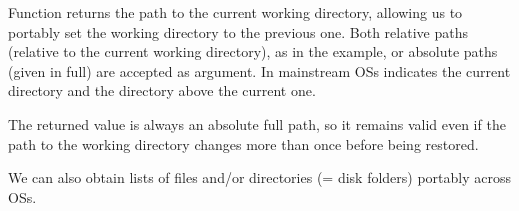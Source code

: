\documentclass[krantz2]{krantz}\usepackage{knitr}%
\begin{document}
\begin{knitrout}\footnotesize
{}\color{fgcolor}\begin{kframe}
\begin{alltt}
\hlstd{()}
\end{alltt}
\end{kframe}
\end{knitrout}

Function  returns the path to the current working directory, allowing us to portably set the working directory to the previous one. Both relative paths (relative to the current working directory), as in the example, or absolute paths (given in full) are accepted as argument. In mainstream OSs  indicates the current directory and  the directory above the current one.

\begin{knitrout}\footnotesize
{}\color{fgcolor}\begin{kframe}
\begin{alltt}
 \hlkwb{<-} \hlstd{(}\hlstd{)}
\hlstd{()}
\end{alltt}
\end{kframe}
\end{knitrout}

The returned value is always an absolute full path, so it remains valid even if the path to the working directory changes more than once before being restored.

\begin{knitrout}\footnotesize
{}\color{fgcolor}\begin{kframe}
\begin{alltt}
\hlstd{()}
\end{alltt}
\end{kframe}
\end{knitrout}

We can also obtain lists of files and/or directories (= disk folders) portably across OSs.
\end{document}
